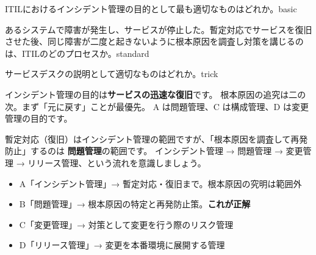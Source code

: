 
\begin{mondai}{ITILにおけるインシデント管理の目的として最も適切なものはどれか。}{basic}
\end{mondai}

\begin{mondai}{あるシステムで障害が発生し、サービスが停止した。暫定対応でサービスを復旧させた後、同じ障害が二度と起きないように根本原因を調査し対策を講じるのは、ITILのどのプロセスか。}{standard}
\end{mondai}

\begin{mondai}{サービスデスクの説明として適切なものはどれか。}{trick}
\end{mondai}

\kaitoupage

\begin{kaisetsu}
インシデント管理の目的は\textbf{サービスの迅速な復旧}です。
根本原因の追究は二の次。まず「元に戻す」ことが最優先。
A は問題管理、C は構成管理、D は変更管理の目的です。
\end{kaisetsu}

\begin{kaisetsu}
暫定対応（復旧）はインシデント管理の範囲ですが、「根本原因を調査して再発防止」するのは
\textbf{問題管理}の範囲です。
インシデント管理 → 問題管理 → 変更管理 → リリース管理、という流れを意識しましょう。
\end{kaisetsu}
\begin{goutoubun}
\begin{itemize}
  \item A「インシデント管理」→ 暫定対応・復旧まで。根本原因の究明は範囲外
  \item B「問題管理」→ 根本原因の特定と再発防止策。\textbf{これが正解}
  \item C「変更管理」→ 対策として変更を行う際のリスク管理
  \item D「リリース管理」→ 変更を本番環境に展開する管理
\end{itemize}
\end{goutoubun}


